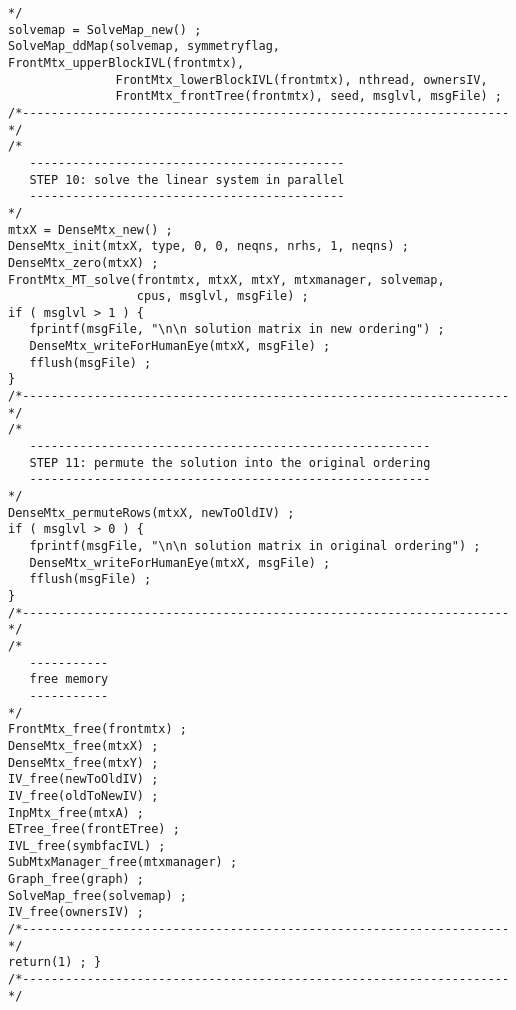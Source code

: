 \begin{verbatim}
*/
solvemap = SolveMap_new() ;
SolveMap_ddMap(solvemap, symmetryflag, FrontMtx_upperBlockIVL(frontmtx),
               FrontMtx_lowerBlockIVL(frontmtx), nthread, ownersIV, 
               FrontMtx_frontTree(frontmtx), seed, msglvl, msgFile) ;
/*--------------------------------------------------------------------*/
/*
   --------------------------------------------
   STEP 10: solve the linear system in parallel
   --------------------------------------------
*/
mtxX = DenseMtx_new() ;
DenseMtx_init(mtxX, type, 0, 0, neqns, nrhs, 1, neqns) ;
DenseMtx_zero(mtxX) ;
FrontMtx_MT_solve(frontmtx, mtxX, mtxY, mtxmanager, solvemap,
                  cpus, msglvl, msgFile) ;
if ( msglvl > 1 ) {
   fprintf(msgFile, "\n\n solution matrix in new ordering") ;
   DenseMtx_writeForHumanEye(mtxX, msgFile) ;
   fflush(msgFile) ;
}
/*--------------------------------------------------------------------*/
/*
   --------------------------------------------------------
   STEP 11: permute the solution into the original ordering
   --------------------------------------------------------
*/
DenseMtx_permuteRows(mtxX, newToOldIV) ;
if ( msglvl > 0 ) {
   fprintf(msgFile, "\n\n solution matrix in original ordering") ;
   DenseMtx_writeForHumanEye(mtxX, msgFile) ;
   fflush(msgFile) ;
}
/*--------------------------------------------------------------------*/
/*
   -----------
   free memory
   -----------
*/
FrontMtx_free(frontmtx) ;
DenseMtx_free(mtxX) ;
DenseMtx_free(mtxY) ;
IV_free(newToOldIV) ;
IV_free(oldToNewIV) ;
InpMtx_free(mtxA) ;
ETree_free(frontETree) ;
IVL_free(symbfacIVL) ;
SubMtxManager_free(mtxmanager) ;
Graph_free(graph) ;
SolveMap_free(solvemap) ;
IV_free(ownersIV) ;
/*--------------------------------------------------------------------*/
return(1) ; }
/*--------------------------------------------------------------------*/
\end{verbatim}
